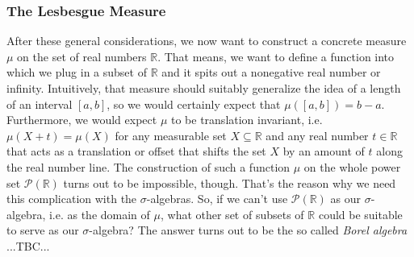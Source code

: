 

\subsubsection{The Lesbesgue Measure}
After these general considerations, we now want to construct a concrete measure $\mu$ on the set of real numbers $\mathbb{R}$. That means, we want to define a function into which we plug in a subset of $\mathbb{R}$ and it spits out a nonegative real number or infinity. Intuitively, that measure should suitably generalize the idea of a length of an interval $[a,b]$, so we would certainly expect that $\mu([a,b]) = b-a$. Furthermore, we would expect $\mu$ to be translation invariant, i.e. $\mu(X + t) = \mu(X)$ for any measurable set $X \subseteq \mathbb{R}$ and any real number $t \in \mathbb{R}$ that acts as a translation or offset that shifts the set $X$ by an amount of $t$ along the real number line. The construction of such a function $\mu$ on the whole power set $\mathcal{P}(\mathbb{R})$ turns out to be impossible, though. That's the reason why we need this complication with the $\sigma$-algebras. So, if we can't use $\mathcal{P}(\mathbb{R})$ as our $\sigma$-algebra, i.e. as the domain of $\mu$, what other set of subsets of $\mathbb{R}$ could be suitable to serve as our $\sigma$-algebra? The answer turns out to be the so called \emph{Borel algebra} ...TBC...








